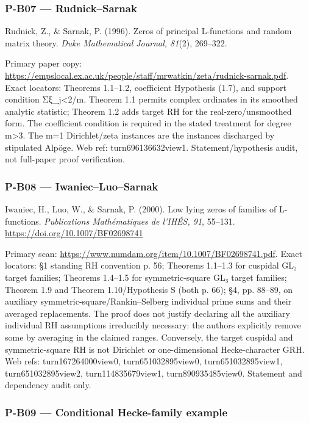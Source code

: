 \documentclass[11pt,a4paper]{article}
\theoremstyle{definition}\newtheorem{definition}{Definition}
\begin{document}
\subsubsection{P-B07 --- Rudnick--Sarnak}\label{p-b07--rudnicksarnak}

Rudnick, Z., \& Sarnak, P. (1996). Zeros of principal L-functions and
random matrix theory. \emph{Duke Mathematical Journal, 81}(2), 269--322.

Primary paper copy:
\url{https://empslocal.ex.ac.uk/people/staff/mrwatkin/zeta/rudnick-sarnak.pdf}.
Exact locators: Theorems 1.1--1.2, coefficient Hypothesis (1.7), and
support condition Σ\textbar ξ\_j\textbar\textless2/m. Theorem 1.1
permits complex ordinates in its smoothed analytic statistic; Theorem
1.2 adds target RH for the real-zero/unsmoothed form. The coefficient
condition is required in the stated treatment for degree m\textgreater3.
The m=1 Dirichlet/zeta instances are the instances discharged by
stipulated Alpöge. Web ref: turn696136632view1. Statement/hypothesis
audit, not full-paper proof verification.

\subsubsection{P-B08 ---
Iwaniec--Luo--Sarnak}\label{p-b08--iwaniecluosarnak}

Iwaniec, H., Luo, W., \& Sarnak, P. (2000). Low lying zeros of families
of L-functions. \emph{Publications Mathématiques de l'IHÉS, 91},
55--131. \url{https://doi.org/10.1007/BF02698741}

Primary scan: \url{https://www.numdam.org/item/10.1007/BF02698741.pdf}.
Exact locators: §1 standing RH convention p. 56; Theorems 1.1--1.3 for
cuspidal GL₂ target families; Theorems 1.4--1.5 for symmetric-square GL₃
target families; Theorem 1.9 and Theorem 1.10/Hypothesis S (both p. 66);
§4, pp. 88--89, on auxiliary symmetric-square/Rankin--Selberg individual
prime sums and their averaged replacements. The proof does not justify
declaring all the auxiliary individual RH assumptions irreducibly
necessary: the authors explicitly remove some by averaging in the
claimed ranges. Conversely, the target cuspidal and symmetric-square RH
is not Dirichlet or one-dimensional Hecke-character GRH. Web refs:
turn167264000view0, turn651032895view0, turn651032895view1,
turn651032895view2, turn114835679view1, turn890935485view0. Statement
and dependency audit only.

\subsubsection{P-B09 --- Conditional Hecke-family
example}\label{p-b09--conditional-hecke-family-example}
\end{document}
